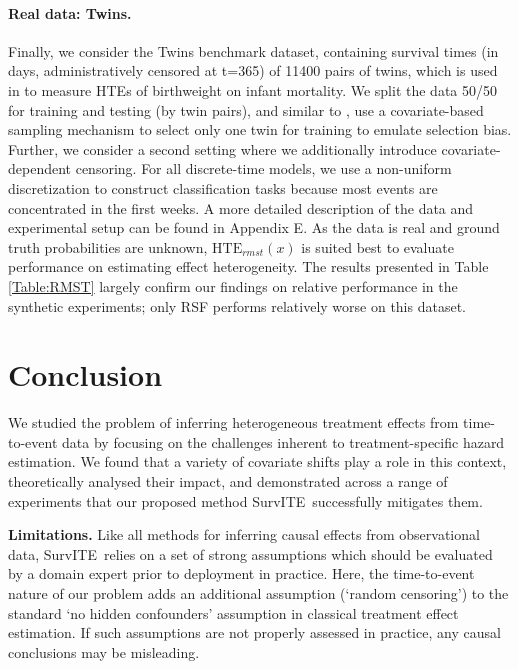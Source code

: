 \documentclass{article}
\newcommand{\proposed}{{SurvITE}}
\begin{document}
\paragraph{Real data: Twins.}\label{sec:twins}
Finally, we consider the Twins benchmark dataset, containing survival times (in days, administratively censored at t=365) of 11400 pairs of twins, which is used in \cite{louizos2017causal, yoon2018ganite} to measure HTEs of birthweight on infant mortality. We split the data 50/50 for training and testing (by twin pairs), and similar to \cite{yoon2018ganite}, use a covariate-based sampling mechanism to select only one twin for training to emulate selection bias. Further, we consider a second setting where we additionally introduce covariate-dependent censoring. For all discrete-time models, we use a non-uniform discretization to construct classification tasks because most events are concentrated in the first weeks. A more detailed description of the data and experimental setup can be found in Appendix E. As the data is real and ground truth probabilities are unknown, $\text{HTE}_{rmst}(x)$ is suited best to evaluate performance on estimating effect heterogeneity. The results presented in Table \ref{Table:RMST} largely confirm our findings on relative performance in the synthetic experiments; only RSF performs relatively worse on this dataset. 

\section{Conclusion} We studied the problem of inferring heterogeneous treatment effects from time-to-event data by focusing on the challenges inherent to treatment-specific hazard estimation. We found that a variety of covariate shifts play a role in this context, theoretically analysed their impact, and demonstrated across a range of experiments that our proposed method \proposed~successfully mitigates them.

\textbf{Limitations.} Like all methods for inferring causal effects from observational data, \proposed~relies on a set of strong assumptions which should be evaluated by a domain expert prior to deployment in practice. Here, the time-to-event nature of our problem adds an additional assumption (`random censoring') to the standard `no hidden confounders' assumption in classical treatment effect estimation. If such assumptions are not properly assessed in practice, any causal conclusions may be misleading. 

\clearpage
\end{document}
